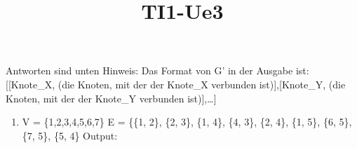 \documentclass[11pt]{article}
\title{TI1-Ue3}
\providecommand{\tightlist}{%
      \setlength{\itemsep}{0pt}\setlength{\parskip}{0pt}}
\begin{document}
    
    \maketitle
    
    

    
    Antworten sind unten Hinweis: Das Format von G' in der Ausgabe ist:
{[}{[}Knote\_X, (die Knoten, mit der der Knote\_X verbunden
ist){]},{[}Knote\_Y, (die Knoten, mit der der Knote\_Y verbunden
ist){]},\ldots{}{]}

    \begin{enumerate}
\def\labelenumi{\alph{enumi})}
\tightlist
\item
  V = \{1,2,3,4,5,6,7\} E = \{\{1, 2\}, \{2, 3\}, \{1, 4\}, \{4, 3\},
  \{2, 4\}, \{1, 5\}, \{6, 5\}, \{7, 5\}, \{5, 4\} Output:
\end{enumerate}
\end{document}
